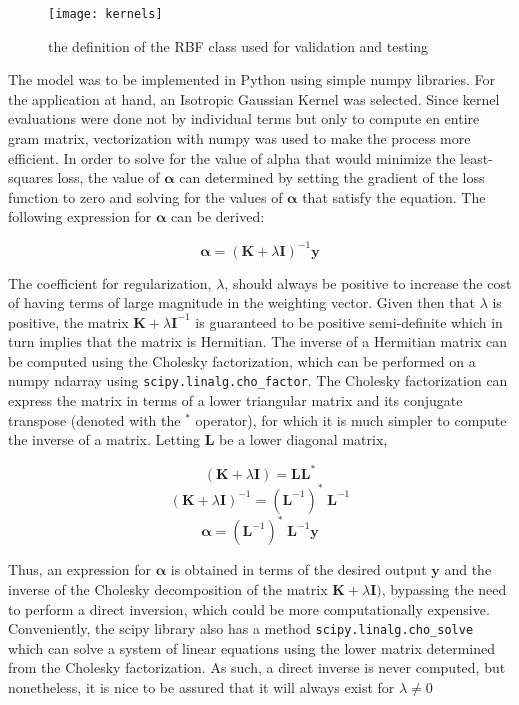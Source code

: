 \documentclass{article}
\begin{document}
\begin{figure}[H]
\centering
\texttt{[image: kernels]}
\caption{the definition of the RBF class used for validation and testing}
\end{figure}

The model was to be implemented in Python using simple numpy libraries. For the application at hand, an Isotropic Gaussian Kernel was selected. Since kernel evaluations were done not by individual terms but only to compute en entire gram matrix, vectorization with numpy was used to make the process more efficient. In order to solve for the value of alpha that would minimize the least-squares loss, the value of $\boldsymbol\alpha$ can determined by setting the gradient of the loss function to zero and solving for the values of $\boldsymbol\alpha$ that satisfy the equation. The following expression for $\boldsymbol\alpha$ can be derived:

\begin{equation}
\boldsymbol\alpha = (\mathbf{K} + \lambda \mathbf{I})^{-1} \mathbf{y}
\end{equation}

The coefficient for regularization, $\lambda$, should always be positive to increase the cost of having terms of large magnitude in the weighting vector. Given then that $\lambda$ is positive, the matrix $\mathbf{K} + \lambda \mathbf{I}^{-1}$ is guaranteed to be positive semi-definite which in turn implies that the matrix is Hermitian. The inverse of a Hermitian matrix can be computed using the Cholesky factorization, which can be performed on a numpy ndarray using \verb+scipy.linalg.cho_factor+. The Cholesky factorization can express the matrix in terms of a lower triangular matrix and its conjugate transpose (denoted with the $^*$ operator), for which it is much simpler to compute the inverse of a matrix. Letting $\mathbf{L}$ be a lower diagonal matrix,

\begin{equation}
(\mathbf{K} + \lambda \mathbf{I}) = \mathbf{L} \mathbf{L}^*
\end{equation}
\begin{equation}
(\mathbf{K} + \lambda \mathbf{I})^{-1} = (\mathbf{L}^{-1})^* \;\mathbf{L}^{-1}
\end{equation}
\begin{equation}
\boldsymbol\alpha = (\mathbf{L}^{-1})^* \;\mathbf{L}^{-1} \mathbf{y}
\end{equation}

Thus, an expression for $\boldsymbol\alpha$ is obtained in terms of the desired output $\mathbf{y}$ and the inverse of the Cholesky decomposition of the matrix $\mathbf{K} + \lambda \mathbf{I})$, bypassing the need to perform a direct inversion, which could be more computationally expensive. Conveniently, the scipy library also has a method \verb+scipy.linalg.cho_solve+ which can solve a system of linear equations using the lower matrix determined from the Cholesky factorization. As such, a direct inverse is never computed, but nonetheless, it is nice to be assured that it will always exist for $\lambda \neq 0$
\end{document}
